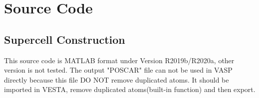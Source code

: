 
\chapter{Source Code}

\section{Supercell Construction}

\begin{remark}
    This source code is MATLAB format under Version R2019b/R2020a, other version is not tested. The output "POSCAR" file can not be used in VASP directly because this file DO NOT remove duplicated atoms. It should be imported in VESTA, remove duplicated atoms(built-in function) and then export.
\end{remark}

